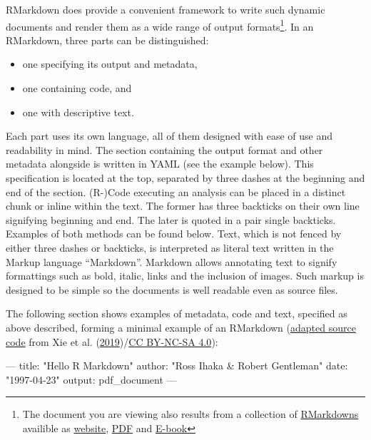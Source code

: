 \documentclass[12pt,a4paper,]{article}
\newenvironment{Shaded}{\begin{snugshade}}{\end{snugshade}}
\newcommand{\AttributeTok}[1]{\textcolor[rgb]{0.77,0.63,0.00}{#1}}
\newcommand{\FunctionTok}[1]{\textcolor[rgb]{0.00,0.00,0.00}{#1}}
\newcommand{\OtherTok}[1]{\textcolor[rgb]{0.56,0.35,0.01}{#1}}
\newcommand{\StringTok}[1]{\textcolor[rgb]{0.31,0.60,0.02}{#1}}
\providecommand{\tightlist}{%
  \setlength{\itemsep}{0pt}\setlength{\parskip}{0pt}}
\begin{document}
RMarkdown does provide a convenient framework to write such dynamic documents and render them as a wide range of output formats\footnote{The document you are viewing also results from a collection of \href{https://github.com/aaronpeikert/repro-thesis}{RMarkdowns} availible as \href{https://aaronpeikert.github.io/repro-thesis/}{website}, \href{https://aaronpeikert.github.io/repro-thesis/ma.pdf}{PDF} and \href{https://aaronpeikert.github.io/repro-thesis/ma.epub}{E-book}}. In an RMarkdown, three parts can be distinguished:

\begin{itemize}
\tightlist
\item
  one specifying its output and metadata,
\item
  one containing code, and
\item
  one with descriptive text.
\end{itemize}

Each part uses its own language, all of them designed with ease of use and readability in mind.
The section containing the output format and other metadata alongside is written in YAML (see the example below).
This specification is located at the top, separated by three dashes at the beginning and end of the section.
(R-)Code executing an analysis can be placed in a distinct chunk or inline within the text.
The former has three backticks on their own line signifying beginning and end.
The later is quoted in a pair single backticks.
Examples of both methods can be found below.
Text, which is not fenced by either three dashes or backticks, is interpreted as literal text written in the Markup language ``Markdown''.
Markdown allows annotating text to signify formattings such as bold, italic, links and the inclusion of images.
Such markup is designed to be simple so the documents is well readable even as source files.

The following section shows examples of metadata, code and text, specified as above described, forming a minimal example of an RMarkdown (\href{https://github.com/rstudio/rmarkdown-book/blob/a10b33d47a2b223a8ef643c245d45e4dfc7091b8/02-basics.Rmd\#L15-L39}{adapted source code} from Xie et al. (\protect\hyperlink{ref-xieMarkdownDefinitiveGuide2019}{2019})/\href{https://creativecommons.org/licenses/by-nc-sa/4.0/}{CC BY-NC-SA 4.0}):

\begin{Shaded}
\begin{Highlighting}[]
\OtherTok{---}
\FunctionTok{title:}\AttributeTok{ }\StringTok{"Hello R Markdown"}
\FunctionTok{author:}\AttributeTok{ }\StringTok{"Ross Ihaka & Robert Gentleman"}
\FunctionTok{date:}\AttributeTok{ }\StringTok{"1997-04-23"}
\FunctionTok{output:}\AttributeTok{ pdf_document}
\OtherTok{---}
\end{Highlighting}
\end{Shaded}
\end{document}
